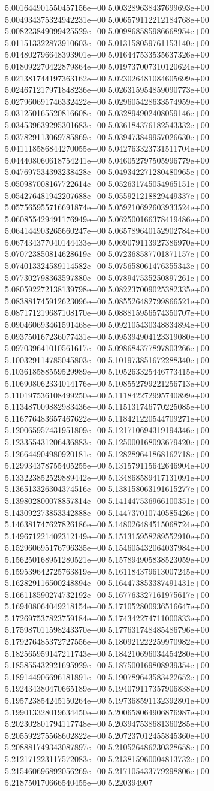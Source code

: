 5.001644901550457156e+00	5.003289638437699693e+00	5.004934375324942231e+00	5.006579112212184768e+00	5.008223849099425529e+00	5.009868585986668954e+00	5.011513322873910603e+00	5.013158059761153140e+00	5.014802796648393901e+00	5.016447533535637326e+00	5.018092270422879864e+00	5.019737007310120624e+00	5.021381744197363162e+00	5.023026481084605699e+00	5.024671217971848236e+00	5.026315954859090773e+00	5.027960691746332422e+00	5.029605428633574959e+00	5.031250165520816608e+00	5.032894902408059146e+00	5.034539639295301683e+00	5.036184376182543332e+00	5.037829113069785869e+00	5.039473849957026630e+00	5.041118586844270055e+00	5.042763323731511704e+00	5.044408060618754241e+00	5.046052797505996779e+00	5.047697534393238428e+00	5.049342271280480965e+00	5.050987008167722614e+00	5.052631745054965151e+00	5.054276481942207688e+00	5.055921218829449337e+00	5.057565955716691874e+00	5.059210692603933524e+00	5.060855429491176949e+00	5.062500166378419486e+00	5.064144903265660247e+00	5.065789640152902784e+00	5.067434377040144433e+00	5.069079113927386970e+00	5.070723850814628619e+00	5.072368587701871157e+00	5.074013324589114582e+00	5.075658061476355343e+00	5.077302798363597880e+00	5.078947535250897261e+00	5.080592272138139798e+00	5.082237009025382335e+00	5.083881745912623096e+00	5.085526482799866521e+00	5.087171219687108170e+00	5.088815956574350707e+00	5.090460693461591468e+00	5.092105430348834894e+00	5.093750167236077431e+00	5.095394904123319080e+00	5.097039641010561617e+00	5.098684377897803266e+00	5.100329114785045803e+00	5.101973851672288340e+00	5.103618588559529989e+00	5.105263325446773415e+00	5.106908062334014176e+00	5.108552799221256713e+00	5.110197536108499250e+00	5.111842272995740899e+00	5.113487009882983436e+00	5.115131746770225085e+00	5.116776483657467622e+00	5.118421220544709271e+00	5.120065957431951809e+00	5.121710694319194346e+00	5.123355431206436883e+00	5.125000168093679420e+00	5.126644904980920181e+00	5.128289641868162718e+00	5.129934378755405255e+00	5.131579115642646904e+00	5.133223852529889442e+00	5.134868589417131091e+00	5.136513326304374516e+00	5.138158063191615277e+00	5.139802800078857814e+00	5.141447536966100351e+00	5.143092273853342888e+00	5.144737010740585426e+00	5.146381747627826186e+00	5.148026484515068724e+00	5.149671221402312149e+00	5.151315958289552910e+00	5.152960695176796335e+00	5.154605432064037984e+00	5.156250168951280521e+00	5.157894905838523059e+00	5.159539642725763819e+00	5.161184379613007245e+00	5.162829116500248894e+00	5.164473853387491431e+00	5.166118590274732192e+00	5.167763327161975617e+00	5.169408064049218154e+00	5.171052800936516647e+00	5.172697537823759184e+00	5.174342274711000833e+00	5.175987011598243370e+00	5.177631748485486796e+00	5.179276485372727556e+00	5.180921222259970982e+00	5.182565959147211743e+00	5.184210696034454280e+00	5.185855432921695929e+00	5.187500169808939354e+00	5.189144906696181891e+00	5.190789643583422652e+00	5.192434380470665189e+00	5.194079117357906838e+00	5.195723854245150264e+00	5.197368591132392801e+00	5.199013328019634450e+00	5.200658064906876987e+00	5.202302801794117748e+00	5.203947538681360285e+00	5.205592275568602822e+00	5.207237012455845360e+00	5.208881749343087897e+00	5.210526486230328658e+00	5.212171223117572083e+00	5.213815960004813732e+00	5.215460696892056269e+00	5.217105433779298806e+00	5.218750170666540455e+00	5.220394907